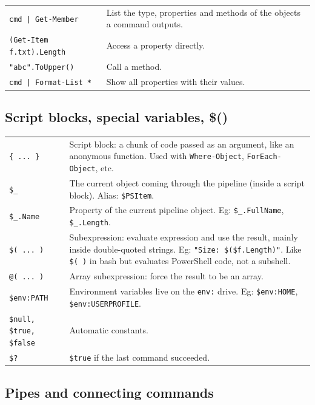 \begin{tabularx}{\linewidth}{lX}
    \texttt{cmd | Get-Member} & List the type, properties and methods of the objects a command outputs.\\
    \texttt{(Get-Item f.txt).Length} & Access a property directly.\\
    \texttt{"abc".ToUpper()} & Call a method.\\
    \texttt{cmd | Format-List *} & Show all properties with their values.\\
    \hline
\end{tabularx}

\subsection{Script blocks, special variables, \$()}

\begin{tabularx}{\linewidth}{lX}
    \texttt{\{ ... \}} & Script block: a chunk of code passed as an argument, like an anonymous function. Used with \texttt{Where-Object}, \texttt{ForEach-Object}, etc.\\
    \texttt{\$\_} & The current object coming through the pipeline (inside a script block). Alias: \texttt{\$PSItem}.\\
    \texttt{\$\_.Name} & Property of the current pipeline object. Eg: \texttt{\$\_.FullName}, \texttt{\$\_.Length}.\\
    \texttt{\$( ... )} & Subexpression: evaluate expression and use the result, mainly inside double-quoted strings. Eg: \texttt{"Size: \$(\$f.Length)"}. Like \texttt{\$( )} in bash but evaluates PowerShell code, not a subshell.\\
    \texttt{@( ... )} & Array subexpression: force the result to be an array.\\
    \texttt{\$env:PATH} & Environment variables live on the \texttt{env:} drive. Eg: \texttt{\$env:HOME}, \texttt{\$env:USERPROFILE}.\\
    \texttt{\$null, \$true, \$false} & Automatic constants.\\
    \texttt{\$?} & \texttt{\$true} if the last command succeeded.\\
    \hline
\end{tabularx}

\subsection{Pipes and connecting commands}

